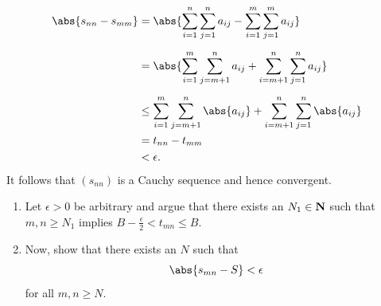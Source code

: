 \documentclass{lew98_solutions}
\begin{document}
\begin{solution}
\begin{enumerate}
        \begin{align*}
            \abs{s_{nn} - s_{mm}} &= \abs{\sum_{i=1}^n \sum_{j=1}^n a_{ij} - \sum_{i=1}^m \sum_{j=1}^m a_{ij}} \\[2mm]
            &= \abs{\sum_{i=1}^m \sum_{j=m+1}^n a_{ij} + \sum_{i=m+1}^n \sum_{j=1}^n a_{ij}} \\[2mm]
            &\leq \sum_{i=1}^m \sum_{j=m+1}^n \abs{a_{ij}} + \sum_{i=m+1}^n \sum_{j=1}^n \abs{a_{ij}} \\
            &= t_{nn} - t_{mm} \\
            &< \epsilon.
        \end{align*}
        It follows that \( (s_{nn}) \) is a Cauchy sequence and hence convergent.
    \end{enumerate}
\end{solution}

\begin{exercise}
\label{ex:2.8.4}
    \begin{enumerate}
        \item Let \( \epsilon > 0 \) be arbitrary and argue that there exists an \( N_1 \in \mathbf{N} \) such that \( m, n \geq N_1 \) implies \( B - \tfrac{\epsilon}{2} < t_{mn} \leq B \).

        \item Now, show that there exists an \( N \) such that
        \[
            \abs{s_{mn} - S} < \epsilon
        \]
        for all \( m, n \geq N \).
    \end{enumerate}
\end{exercise}
\end{document}
